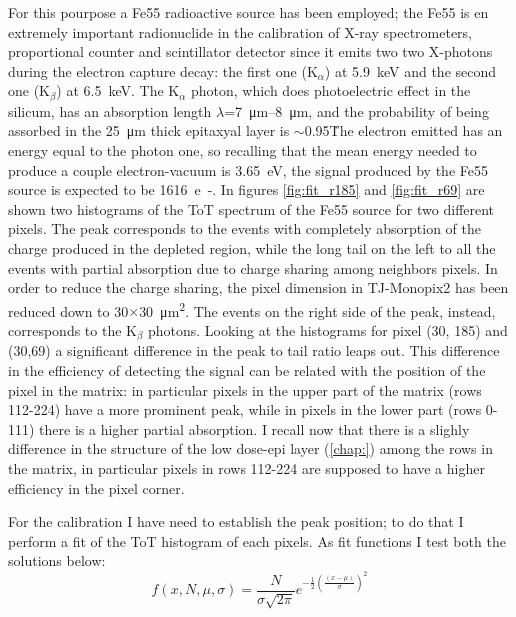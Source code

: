         For this pourpose a Fe55 radioactive source has been employed; the Fe55 is en extremely important radionuclide in the calibration of X-ray spectrometers, proportional counter and scintillator detector since it emits two two X-photons during the electron capture decay: the first one (K$_\alpha$) at \SI{5.9}{keV} and the second one (K$_\beta$) at \SI{6.5}{keV}.
        The K$_\alpha$ photon, which does photoelectric effect in the silicum, has an absorption length $\lambda$=\SIrange{7}{8}{\um}, and the probability of being assorbed in the \SI{25}{\um} thick epitaxyal layer is $\sim$0.95\.
        The electron emitted has an energy equal to the photon one, so recalling that the mean energy needed to produce a couple electron-vacuum is \SI{3.65}{eV}, the signal produced by the Fe55 source is expected to be \SI{1616}{e-}.
        In figures \ref{fig:fit_r185} and \ref{fig:fit_r69} are shown two histograms of the ToT spectrum of the Fe55 source for two different pixels. The peak corresponds to the events with completely absorption of the charge produced in the depleted region, while the long tail on the left to all the events with partial absorption due to charge sharing among neighbors pixels. In order to reduce the charge sharing, the pixel dimension in TJ-Monopix2 has been reduced down to 30$\times$\SI{30}{\um\squared}. 
        The events on the right side of the peak, instead, corresponds to the K$_{\beta}$ photons. 
        Looking at the histograms for pixel (30, 185) and (30,69) a significant difference in the peak to tail ratio leaps out. 
        This difference in the efficiency of detecting the signal can be related with the position of the pixel in the matrix: in particular pixels in the upper part of the matrix (rows 112-224) have a more prominent peak, while in pixels in the lower part (rows 0-111) there is a higher partial absorption. 
        I recall now that there is a slighly difference in the structure of the low dose-epi layer (\ref{chap:}) among the rows in the matrix, in particular pixels in rows 112-224 are supposed to have a higher efficiency in the pixel corner. 
        
        For the calibration I have need to establish the peak position; to do that I perform a fit of the ToT histogram of each pixels. As fit functions I test both the solutions below:  
        \begin{equation}
            f(x, N, \mu, \sigma) = \frac{N}{\sigma \sqrt{2\pi}} e^{-\frac{1}{2}(\frac{(x-\mu)}{\sigma})^2}
            \label{eq:gauss}
        \end{equation} 

